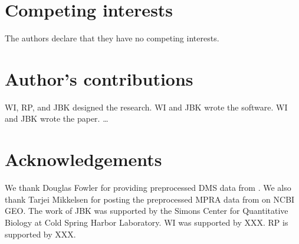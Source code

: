 \documentclass{bmcart}
\begin{document}

\begin{backmatter}

\section*{Competing interests}
The authors declare that they have no competing interests.

\section*{Author's contributions}
WI, RP, and JBK designed the research. WI and JBK wrote the software. WI and JBK wrote the paper. \ldots

\section*{Acknowledgements}
We thank Douglas Fowler for providing preprocessed DMS data from \cite{Fowler:2010gt}. We also thank Tarjei Mikkelsen for posting the preprocessed MPRA data from \cite{Melnikov:2012dw} on NCBI GEO. The work of JBK was supported by the Simons Center for Quantitative Biology at Cold Spring Harbor Laboratory. WI was supported by XXX. RP is supported by XXX.  
  



\end{backmatter}
\end{document}
